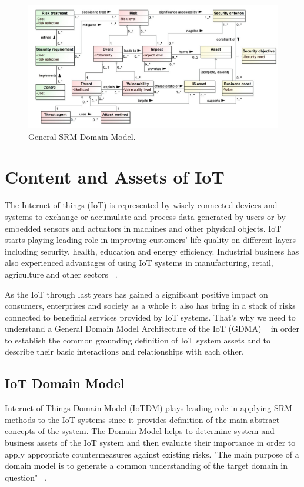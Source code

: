\documentclass[12pt]{article}
\begin{document}
 
\begin{figure} [H] %
	\begin{center}
		\includegraphics[width=1\textwidth]{SRM_Domain}
		\caption{General SRM Domain Model.}
		\label{fig:ref_model}
	\end{center}
\end{figure}

\newpage
\section{Content and Assets of IoT}
The Internet of things (IoT) is represented by wisely connected devices and systems to exchange or accumulate and process data generated by users or by embedded sensors and actuators in machines and other physical objects. IoT starts playing leading role in improving customers' life quality on different layers including security, health, education and energy efficiency. Industrial business has also experienced advantages of using IoT systems in manufacturing, retail, agriculture and other sectors ~\cite{UnderIoT}.

As the IoT through last years has gained a significant positive impact on consumers, enterprises and society as a whole it also has bring in a stack of risks connected to  beneficial services provided by IoT systems. That's why we need to understand a General Domain Model Architecture of the IoT (GDMA)  ~\cite{GDMA} in order to establish the common grounding definition of IoT system assets and to describe their basic interactions  and relationships with each other.

\subsection{IoT Domain Model}

 
 Internet of Things Domain Model (IoTDM) plays leading role in applying SRM methods to the IoT systems since it provides definition of the main abstract concepts of the system. The Domain Model helps to determine system and business assets of the IoT system and then evaluate their importance in order to apply appropriate countermeasures against existing risks. "The main purpose of a domain model is to generate a common understanding of the target domain in question" ~\cite{IoTRefMod}. 
 
\end{document}
